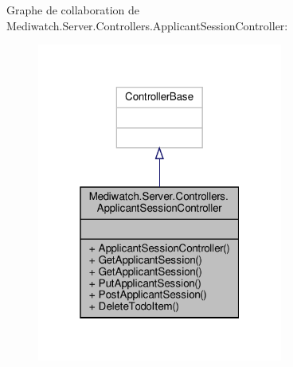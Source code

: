 Graphe de collaboration de Mediwatch.\+Server.\+Controllers.\+Applicant\+Session\+Controller\+:
\nopagebreak
\begin{figure}[H]
\begin{center}
\leavevmode
\includegraphics[width=229pt]{class_mediwatch_1_1_server_1_1_controllers_1_1_applicant_session_controller__coll__graph}
\end{center}
\end{figure}
